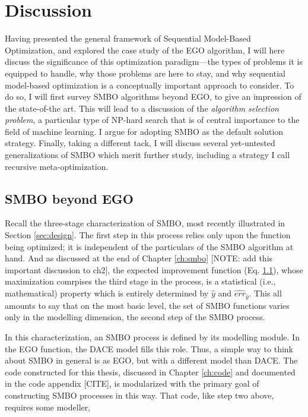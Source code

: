 \chapter{Discussion}

Having presented the general framework of Sequential Model-Based Optimization, and explored the case study of the EGO algorithm, I will here discuss the significance of this optimization paradigm---the types of problems it is equipped to handle, why those problems are here to stay, and why sequential model-based optimization is a conceptually important approach to consider. To do so, I will first survey SMBO algorithms beyond EGO, to give an impression of the state-of-the art. This will lead to a discussion of the \emph{algorithm selection problem}, a particular type of NP-hard search that is of central importance to the field of machine learning. I argue for adopting SMBO as the default solution strategy. Finally, taking a different tack, I will discuss several yet-untested generalizations of SMBO which merit further study, including a strategy I call recursive meta-optimization.

\section{SMBO beyond EGO}

Recall the three-stage characterization of SMBO, most recently illustrated in Section \ref{sec:design}. The first step in this process relies only upon the function being optimized; it is independent of the particulars of the SMBO algorithm at hand. And as discussed at the end of Chapter \ref{ch:smbo} [NOTE: add this important discussion to ch2], the expected improvement function (Eq. \ref{}), whose maximization comrpises the third stage in the process, is a statistical (i.e., mathematical) property which is entirely determined by $\hat{y}$ and $\hat{err}_{\hat{y}}$. This all amounts to say that on the most basic level, the set of SMBO functions varies only in the modelling dimension, the second step of the SMBO process.

In this characterization, an SMBO process is defined by its modelling module. In the EGO function, the DACE model fills this role. Thus, a simple way to think about SMBO in general is as EGO, but with a different model than DACE. The code constructed for this thesis, discussed in Chapter \ref{ch:code} and documented in the code appendix [CITE], is modularized with the primary goal of constructing SMBO processes in this way. That code, like step two above, requires some modeller,

